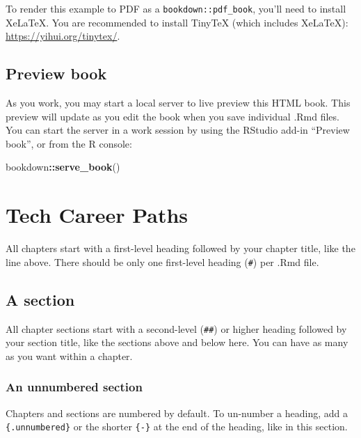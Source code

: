 \documentclass[
]{book}
\newenvironment{Shaded}{\begin{snugshade}}{\end{snugshade}}
\newcommand{\FunctionTok}[1]{\textcolor[rgb]{0.13,0.29,0.53}{\textbf{#1}}}
\newcommand{\NormalTok}[1]{#1}
\newcommand{\SpecialCharTok}[1]{\textcolor[rgb]{0.81,0.36,0.00}{\textbf{#1}}}
\theoremstyle{definition}
\theoremstyle{definition}
\theoremstyle{definition}
\theoremstyle{definition}
\theoremstyle{remark}
\begin{document}
To render this example to PDF as a \texttt{bookdown::pdf\_book}, you'll need to install XeLaTeX. You are recommended to install TinyTeX (which includes XeLaTeX): \url{https://yihui.org/tinytex/}.

\section{Preview book}\label{preview-book}

As you work, you may start a local server to live preview this HTML book. This preview will update as you edit the book when you save individual .Rmd files. You can start the server in a work session by using the RStudio add-in ``Preview book'', or from the R console:

\begin{Shaded}
\begin{Highlighting}[]
\NormalTok{bookdown}\SpecialCharTok{::}\FunctionTok{serve\_book}\NormalTok{()}
\end{Highlighting}
\end{Shaded}

\chapter{Tech Career Paths}\label{tech-career-paths}

All chapters start with a first-level heading followed by your chapter title, like the line above. There should be only one first-level heading (\texttt{\#}) per .Rmd file.

\section{A section}\label{a-section}

All chapter sections start with a second-level (\texttt{\#\#}) or higher heading followed by your section title, like the sections above and below here. You can have as many as you want within a chapter.

\subsection*{An unnumbered section}\label{an-unnumbered-section}

Chapters and sections are numbered by default. To un-number a heading, add a \texttt{\{.unnumbered\}} or the shorter \texttt{\{-\}} at the end of the heading, like in this section.
\end{document}
